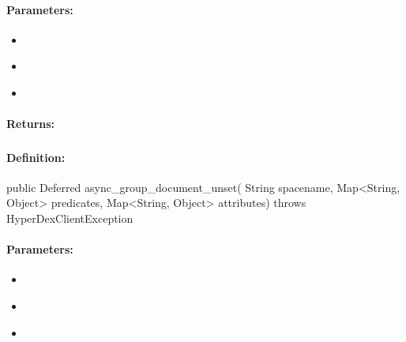 \paragraph{Parameters:}
\begin{itemize}[noitemsep]
\item {}\\

\item {}\\

\item {}\\

\end{itemize}

\paragraph{Returns:}


\pagebreak
\subsubsection{}
\label{api:java:async_group_document_unset}


\paragraph{Definition:}
\begin{javacode}
public Deferred async_group_document_unset(
        String spacename,
        Map<String, Object> predicates,
        Map<String, Object> attributes) throws HyperDexClientException
\end{javacode}

\paragraph{Parameters:}
\begin{itemize}[noitemsep]
\item {}\\

\item {}\\

\item {}\\

\end{itemize}

